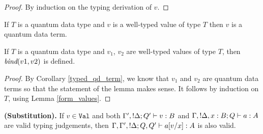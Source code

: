 \documentclass[twoside]{article}
\begin{document}
\begin{proof}
By induction on the typing derivation of $v$.
\end{proof}

\begin{corollary}
\label{typed_qd_term}
If $T$ is a quantum data type and $v$ is a well-typed value of type $T$ then $v$ is 
a quantum data term.
\end{corollary}

\begin{lemma}
\label{bind_qd_terms}
If $T$ is a quantum data type and $v_1$, $v_2$ are well-typed values of 
type $T$, then $\mathop{\textit{bind}}\nolimits(v1,v2)$ is defined.
\end{lemma}

\begin{proof}
By Corollary \hyperref[typed_qd_term]{\ref*{typed_qd_term}}, we know that 
$v_1$ and $v_2$ are quantum data terms so that the statement of the lemma 
makes sense. It follows by induction on $T$, using Lemma
\hyperref[form_values]{\ref*{form_values}}.
\end{proof}

\begin{lemma}
{\bf (Substitution).}
\label{substitution}
If $v\in\mathtt{Val}$ and both $\Gamma',{!}\Delta;Q' \vdash v:B$ and 
$\Gamma,{!}\Delta,x:B;Q \vdash a:A$ are valid typing judgements, 
then $\Gamma,\Gamma',{!}\Delta;Q,Q' \vdash a[v/x]:A$ is also valid.
\end{lemma}
\end{document}
